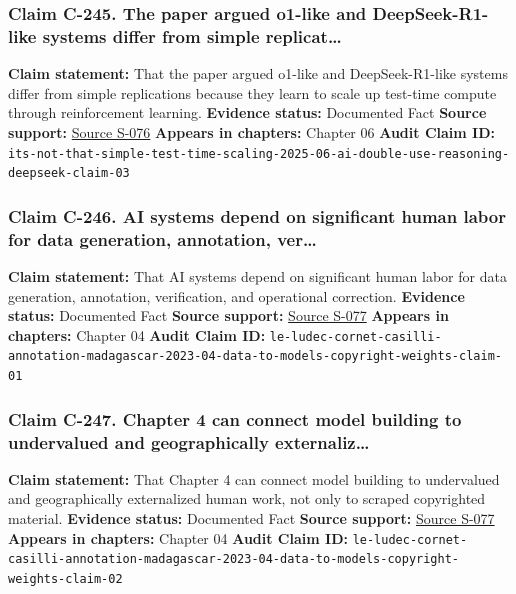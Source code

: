 \documentclass[
  american,
  11pt,
  letterpaper,
]{article}
\begin{document}
\subsubsection{Claim C-245. The paper argued o1-like and
DeepSeek-R1-like systems differ from simple
replicat\ldots{}}\label{claim-c-245-the-paper-argued-o1-like-and-deepseek-r1-like-systems-differ-from-simple-replicat}

\textbf{Claim statement:} That the paper argued o1-like and
DeepSeek-R1-like systems differ from simple replications because they
learn to scale up test-time compute through reinforcement learning.
\textbf{Evidence status:} Documented Fact \textbf{Source support:}
\hyperref[source-s-076-it-s-not-that-simple-an-analysis-of-simple-test-time-scaling]{Source
S-076} \textbf{Appears in chapters:} Chapter 06 \textbf{Audit Claim ID:}
\texttt{its-not-that-simple-test-time-scaling-2025-06-ai-double-use-reasoning-deepseek-claim-03}

\subsubsection{Claim C-246. AI systems depend on significant human labor
for data generation, annotation,
ver\ldots{}}\label{claim-c-246-ai-systems-depend-on-significant-human-labor-for-data-generation-annotation-ver}

\textbf{Claim statement:} That AI systems depend on significant human
labor for data generation, annotation, verification, and operational
correction. \textbf{Evidence status:} Documented Fact \textbf{Source
support:}
\hyperref[source-s-077-the-problem-with-annotation-human-labour-and-outsourcing-between-france-and-madagascar]{Source
S-077} \textbf{Appears in chapters:} Chapter 04 \textbf{Audit Claim ID:}
\texttt{le-ludec-cornet-casilli-annotation-madagascar-2023-04-data-to-models-copyright-weights-claim-01}

\subsubsection{Claim C-247. Chapter 4 can connect model building to
undervalued and geographically
externaliz\ldots{}}\label{claim-c-247-chapter-4-can-connect-model-building-to-undervalued-and-geographically-externaliz}

\textbf{Claim statement:} That Chapter 4 can connect model building to
undervalued and geographically externalized human work, not only to
scraped copyrighted material. \textbf{Evidence status:} Documented Fact
\textbf{Source support:}
\hyperref[source-s-077-the-problem-with-annotation-human-labour-and-outsourcing-between-france-and-madagascar]{Source
S-077} \textbf{Appears in chapters:} Chapter 04 \textbf{Audit Claim ID:}
\texttt{le-ludec-cornet-casilli-annotation-madagascar-2023-04-data-to-models-copyright-weights-claim-02}
\end{document}
